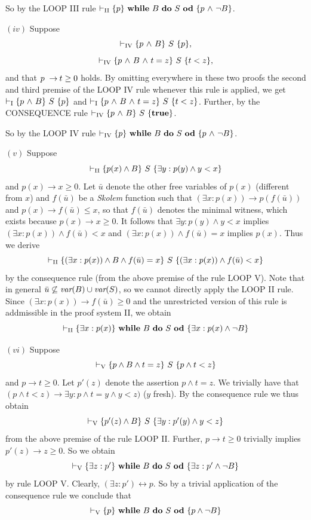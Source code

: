 \documentclass[runningheads]{llncs}       %
\begin{document}
So by the LOOP III rule
$\vdash_{\rm II} \mbox{$\{{p}\}\ {\mbox{$\mbox{{\bf while}\ } {B}\ \mbox{{\bf do}\ } {S}\ \mbox{{\bf od}}$}}\ \{{p \mbox{$\ \wedge\ $} \neg B}\}$}$.
\vspace{2mm}

\NI
$(iv)$ Suppose
\[
  \vdash_{\rm{IV}}  \mbox{$\{{p \mbox{$\ \wedge\ $} B}\}\ {S}\ \{{p}\}$},
\]
\[
  \vdash_{\rm{IV}}  \mbox{$\{{p \mbox{$\ \wedge\ $} B \mbox{$\ \wedge\ $} t=z}\}\ {S}\ \{{t<z}\}$},
\]
and that
$p\ \ra t \geq 0$ holds. 
By omitting everywhere in these two proofs 
the second and third premise of the LOOP IV rule whenever this rule is applied, we get
$\vdash_{\rm{I}}  \mbox{$\{{p \mbox{$\ \wedge\ $} B}\}\ {S}\ \{{p}\}$}$ and
$\vdash_{\rm{I}}  \mbox{$\{{p \mbox{$\ \wedge\ $} B \mbox{$\ \wedge\ $} t=z}\}\ {S}\ \{{t<z}\}$}$. 
Further, by the CONSEQUENCE rule
$\vdash_{\rm{IV}}  \mbox{$\{{p \mbox{$\ \wedge\ $} B}\}\ {S}\ \{{\mathbf{true}}\}$}$.

So by the LOOP IV rule
$\vdash_{\rm IV} \mbox{$\{{p}\}\ {\mbox{$\mbox{{\bf while}\ } {B}\ \mbox{{\bf do}\ } {S}\ \mbox{{\bf od}}$}}\ \{{p \mbox{$\ \wedge\ $} \neg B}\}$}$.
\vspace{2mm}

\NI
$(v)$ Suppose
$$\vdash_{\rm{II}}\mbox{$\{{p(x)\wedge B}\}\ {S}\ \{{\exists y: p(y)\wedge y< x}\}$}$$
and $p(x)\rightarrow x\geq 0$.
Let $\bar{u}$ denote the other free variables of $p(x)$
(different from $x$) and $f(\bar{u})$  be a \emph{Skolem} function
such that
$(\exists x:p(x))\rightarrow p(f(\bar{u}))$
and $p(x)\rightarrow f(\bar{u})\leq x $, so that
$f(\bar{u})$ denotes the minimal witness, which exists
because 
$p(x)\rightarrow x\geq 0$.
It follows that
$\exists y: p(y)\wedge y< x$
implies 
$(\exists x:p(x)) \wedge f(\bar{u})< x$ and
$(\exists x:p(x)) \wedge f(\bar{u})=x$  implies
$p(x)$.
Thus we derive 
$$\vdash_{\rm{II}}\mbox{$\{{(\exists x:p(x))\wedge B\wedge f(\bar{u})=x}\}\ {S}\ \{{(\exists x:p(x))\wedge f(\bar{u})<x}\}$}$$
by the consequence rule  (from the
above premise of the rule LOOP V).
Note that in general $\bar{u}\not\subseteq \mbox{\it var}(B)\cup 
\mbox{\it var}(S)$, so we cannot directly apply the LOOP II rule.
Since $(\exists x:p(x)) \rightarrow f(\bar{u})\geq 0$ and 
the unrestricted version of this rule is addmissible in the proof system II, we
obtain
$$\vdash_{\rm{II}} \mbox{$\{{\exists x:p(x)}\}\ {\mbox{$\mbox{{\bf while}\ } {B}\ \mbox{{\bf do}\ } {S}\ \mbox{{\bf od}}$}}\ \{{\exists x:p(x) \wedge \neg B}\}$}$$

\vspace{2mm}


\NI
$(vi)$ Suppose
$$\vdash_{\rm{V}}\mbox{$\{{p\wedge B\wedge t=z}\}\ {S}\ \{{p\wedge t<z}\}$}$$
and $p\rightarrow t\geq 0$.
Let
$p'(z)$ denote the assertion $p\wedge t=z$.
We trivially have that
$(p\wedge t<z)\rightarrow \exists y:p\wedge t=y \wedge y<z)$
($y$ fresh).
By the consequence rule
we thus obtain 
$$\vdash_{\rm V}\mbox{$\{{p'(z)\wedge B}\}\ {S}\ \{{\exists y: p'(y)\wedge y< z}\}$}$$
from the above premise of the rule LOOP II.
Further, $p\rightarrow t\geq 0$ trivially implies
$p'(z)\rightarrow z\geq 0$.
So we obtain 
$$\vdash_{\rm V}\mbox{$\{{\exists z:p'}\}\ {\mbox{$\mbox{{\bf while}\ } {B}\ \mbox{{\bf do}\ } {S}\ \mbox{{\bf od}}$}}\ \{{\exists z:p'\wedge  \neg B}\}$}$$
by rule LOOP V.
Clearly, $(\exists z:p')\leftrightarrow p$.
So by a trivial  application of the consequence rule
we conclude that 
$$\vdash_{\rm V}\mbox{$\{{p}\}\ {\mbox{$\mbox{{\bf while}\ } {B}\ \mbox{{\bf do}\ } {S}\ \mbox{{\bf od}}$}}\ \{{p \wedge \neg B}\}$}$$
\HB
\end{document}
